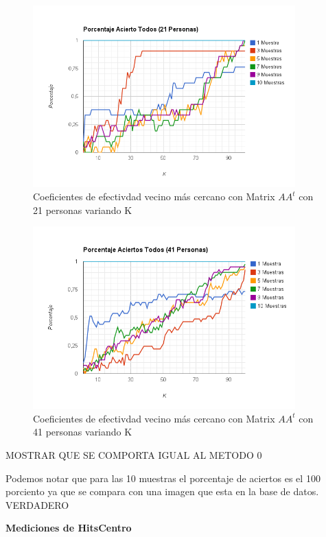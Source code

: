 \begin{figure}[H]
\includegraphics[width=0.9\textwidth]{img/imagek.png}
     \caption{Coeficientes de efectivdad vecino más cercano con Matrix $AA^t$ con 21 personas variando K}
\end{figure}

\begin{figure}[H]
\includegraphics[width=0.9\textwidth]{img/imagel.png}
     \caption{Coeficientes de efectivdad vecino más cercano con Matrix $AA^t$ con 41 personas variando K}
\end{figure}

MOSTRAR QUE SE COMPORTA IGUAL AL METODO 0

Podemos notar  que para las 10 muestras el porcentaje de aciertos es el 100 porciento ya que se compara con una imagen que esta en la base de datos. VERDADERO

\textbf{Mediciones de HitsCentro}

